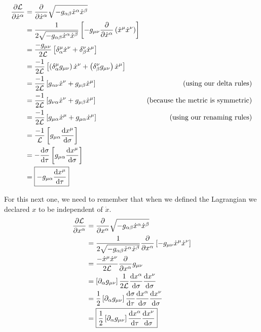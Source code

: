 \documentclass[11pt]{article}
\begin{document}
\begin{enumerate}[label=\alph*)]
\begin{align*}
\pdv{\mathcal{L}}{\dot{x}^\alpha} & = \pdv{\dot{x}^\alpha}\sqrt{-g_{\alpha\beta}\dot{x}^\alpha\dot{x}^\beta}\\
& = \frac{1}{2\sqrt{-g_{\alpha\beta}\dot{x}^\alpha\dot{x}^\beta}}\left[-g_{\mu\nu}\pdv{\dot{x}^\alpha}\left(\dot{x}^\mu\dot{x}^\nu\right)\right]\\
& = \frac{-g_{\mu\nu}}{2\mathcal{L}}\left[\delta_\alpha^\mu \dot{x}^\nu + \delta_\beta^\nu \dot{x}^\mu\right]\\
& = \frac{-1}{2\mathcal{L}}\left[\left(\delta_\alpha^\mu g_{\mu\nu}\right)\dot{x}^\nu + \left(\delta_\beta^\nu g_{\mu\nu}\right)\dot{x}^\mu\right]\\
& = \frac{-1}{2\mathcal{L}}\left[g_{\alpha\nu}\dot{x}^\nu + g_{\mu\beta}\dot{x}^\mu\right] & \text{(using our delta rules)}\\
& = \frac{-1}{2\mathcal{L}}\left[g_{\nu\alpha}\dot{x}^\nu + g_{\mu\beta}\dot{x}^\mu\right] & \text{(because the metric is symmetric)}\\
&= \frac{-1}{2\mathcal{L}}\left[g_{\mu\alpha}\dot{x}^\mu + g_{\mu\alpha}\dot{x}^\mu\right] & \text{(using our renaming rules)}\\
& = \frac{-1}{\mathcal{L}}\left[g_{\mu\alpha}\dv{x^\mu}{\sigma}\right]\\
& = -\dv{\sigma}{\tau}\left[g_{\mu\alpha}\dv{x^\mu}{\sigma}\right]\\
& = \boxed{-g_{\mu\alpha}\dv{x^\mu}{\tau}}
\end{align*}

For this next one, we need to remember that when we defined the Lagrangian we declared $x$ to be independent of $\dot{x}$.
\begin{align*}
\pdv{\mathcal{L}}{x^\alpha} & =  \pdv{x^\alpha}\sqrt{-g_{\alpha\beta}\dot{x}^\alpha\dot{x}^\beta}\\
& = \frac{1}{2\sqrt{-g_{\alpha\beta}\dot{x}^\alpha\dot{x}^\beta}}\pdv{x^\alpha}\left[-g_{\mu\nu}\dot{x}^\mu\dot{x}^\nu\right]\\
& = \frac{-\dot{x}^\mu\dot{x}^\nu}{2\mathcal{L}} \pdv{x^\alpha}g_{\mu\nu}\\
& = \left[\partial_\alpha g_{\mu\nu}\right]\frac{1}{2\mathcal{L}}\dv{x^\alpha}{\sigma}\dv{x^\nu}{\sigma}\\
& = \frac{1}{2}\left[\partial_\alpha g_{\mu\nu}\right]\dv{\sigma}{\tau}\dv{x^\alpha}{\sigma}\dv{x^\nu}{\sigma}\\
& = \boxed{\frac{1}{2}\left[\partial_\alpha g_{\mu\nu}\right]\dv{x^\alpha}{\tau}\dv{x^\nu}{\sigma}}\\
\end{align*}


\end{enumerate}
\end{document}
